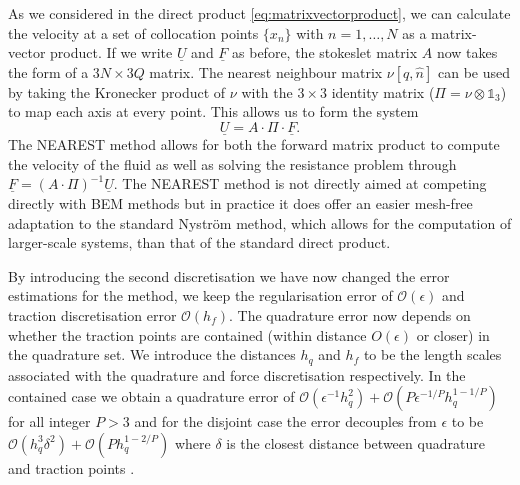 As we considered in the direct product \cref{eq:matrixvectorproduct}, we can calculate the velocity at a set of collocation points $\{x_n\}$ with $n=1,\dots,N$ as a matrix-vector product. If we write $\underline{U}$ and $\underline{F}$ as before, the stokeslet matrix $A$ now takes the form of a $3N \times 3Q$ matrix. The nearest neighbour matrix $\nu [q, \hat{n}]$ can be used by taking the Kronecker product of $\nu$ with the $3 \times 3$ identity matrix ($\Pi = \nu \otimes \mathds{1}_{3}$) to map each axis at every point. This allows us to form the system
\begin{equation}
    \underline{U} = A \cdot \Pi \cdot \underline{F}.
\end{equation}
The NEAREST method allows for both the forward matrix product to compute the velocity of the fluid as well as solving the resistance problem through $\underline{F} = (A \cdot \Pi)^{-1} \underline{U}$. The NEAREST method is not directly aimed at competing directly with BEM methods but in practice it does offer an easier mesh-free adaptation to the standard Nyström method, which allows for the computation of larger-scale systems, than that of the standard direct product.

By introducing the second discretisation we have now changed the error estimations for the method, we keep the regularisation error of $\mathcal{O}(\epsilon)$ and traction discretisation error $\mathcal{O}(h_f)$. The quadrature error now depends on whether the traction points are contained (within distance $O(\epsilon)$ or closer) in the quadrature set. We introduce the distances $h_q$ and $h_f$ to be the length scales associated with the quadrature and force discretisation respectively. In the contained case we obtain a quadrature error of $\mathcal{O}(\epsilon^{-1}h^2_q) + \mathcal{O}(P\epsilon^{-1/P}h^{1-1/P}_q)$ for all integer $P>3$ and for the disjoint case the error decouples from $\epsilon$ to be $\mathcal{O}(h^3_q\delta^{2}) + \mathcal{O}(Ph^{1-2/P}_q)$ where $\delta$ is the closest distance between quadrature and traction points \cite{Gallagher2019SharpEquation}.

